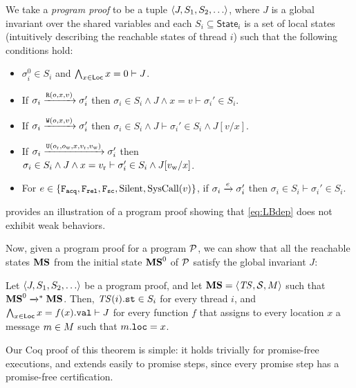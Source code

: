 
We take a \emph{program proof} to be a tuple ${\langle{J,S_1,S_2,\ldots}\rangle}$, 
where $J$ is a global invariant over the shared variables
and each $S_i \subseteq \textsf{State}_i$ is a set of local states 
(intuitively describing the reachable states of thread $i$) such that the following conditions hold:
\begin{itemize}
  \setlength\itemsep{-2pt}
\item $\sigma_i^0 \in S_i$
and $\bigwedge_{x\in{\mathsf{Loc}}} x=0 \vdash J$.
\item
If $\sigma_i \xrightarrow{\texttt{R}(o,x,v)} \sigma_i'$ then
$\sigma_i\in S_i \land J \land x = v \vdash \sigma_i'\in S_i$.
\item
If $\sigma_i \xrightarrow{\texttt{W}(o,x,v)} \sigma_i'$ then
$\sigma_i\in S_i \land J \vdash \sigma_i'\in S_i \land J[v/x]$.
\item
If $\sigma_i \xrightarrow{\texttt{U}(o_{\text{r}},o_{\text{w}},x,v_{\text{r}},v_{\text{w}})} \sigma_i'$ then \\
$\sigma_i\in S_i \land J \land x = v_{\text{r}} \vdash \sigma_i'\in S_i \land J[v_{\text{w}}/x]$.
\item
For $e\in \{\texttt{F}_{\texttt{acq}},\texttt{F}_{\texttt{rel}},\texttt{F}_{\texttt{sc}},{\text{Silent}},{\text{SysCall}(v)}\}$,
if $\sigma_i \xrightarrow{e} \sigma_i'$ then
 $\sigma_i\in S_i \vdash \sigma_i'\in S_i$.
\end{itemize}
 provides an illustration of a program proof showing that \ref{eq:LBdep}
 does not exhibit weak behaviors.

Now, given a program proof for a program $\mathcal{P}$, we can show that
all the reachable states ${\mathbf{MS}}$ from the initial state ${\mathbf{MS}}^0$ of $\mathcal{P}$
satisfy the global invariant $J$:

\begin{theorem}[Soundness]
Let ${\langle{J,S_1,S_2,\ldots}\rangle}$ be a program proof, 
and let ${\mathbf{MS}}={\langle{\mathit{TS},{\cal S},M}\rangle}$ such that ${\mathbf{MS}}^0 \xrightarrow{}^* {\mathbf{MS}}$.
Then, $\mathit{TS}(i).\texttt{st} \in S_i$ for every thread $i$, and 
$\bigwedge_{x\in{\mathsf{Loc}}} x=f(x).{\texttt{val}} \vdash J$
for every function $f$ that assigns to every location $x$ a message $m\in M$ such that $m.{\texttt{loc}}=x$.
\end{theorem}

Our Coq proof of this theorem is simple:
it holds trivially for promise-free executions,
and extends easily to promise steps, since every promise step has a promise-free certification.

